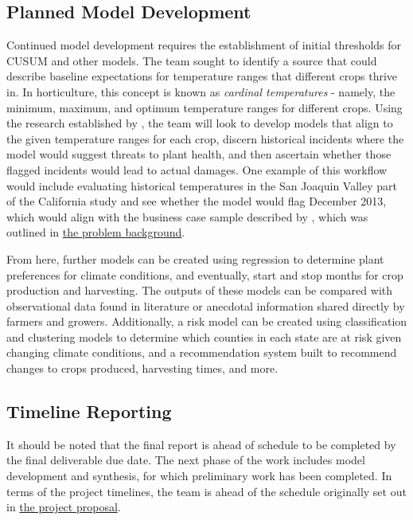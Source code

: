\documentclass{article}
\begin{document}
\subsection{Planned Model Development}
\hspace{.5cm}Continued model development requires the establishment of initial thresholds for CUSUM and other models. The team sought to identify a source that could describe baseline expectations for temperature ranges that different crops thrive in. In horticulture, this concept is known as \textit{cardinal temperatures} - namely, the minimum, maximum, and optimum temperature ranges for different crops. Using the research established by \citep{Horticulturae}, the team will look to develop models that align to the given temperature ranges for each crop, discern historical incidents where the model would suggest threats to plant health, and then ascertain whether those flagged incidents would lead to actual damages. One example of this workflow would include evaluating historical temperatures in the San Joaquin Valley part of the California study and see whether the model would flag December 2013, which would align with the business case sample described by \citep{CNBC}, which was outlined in \hyperref[sec:background]{the problem background}.

From here, further models can be created using regression to determine plant preferences for climate conditions, and eventually, start and stop months for crop production and harvesting. The outputs of these models can be compared with observational data found in literature or anecdotal information shared directly by farmers and growers. Additionally, a risk model can be created using classification and clustering models to determine which counties in each state are at risk given changing climate conditions, and a recommendation system built to recommend changes to crops produced, harvesting times, and more. 

\subsection{Timeline Reporting}
\hspace{.5cm}It should be noted that the final report is ahead of schedule to be completed by the final deliverable due date. The next phase of the work includes model development and synthesis, for which preliminary work has been completed. In terms of the project timelines, the team is ahead of the schedule originally set out in \href{{https://github.gatech.edu/MGT-6203-Spring-2024-Canvas/Team-95/blob/8e0b617b8c53ad76f4974ec25019710f2ce385cc/Project%
\end{document}
